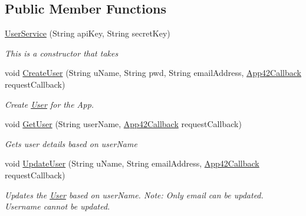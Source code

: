 \subsection*{Public Member Functions}
\begin{DoxyCompactItemize}
\item 
\hyperlink{classcom_1_1shephertz_1_1app42_1_1paas_1_1sdk_1_1windows_1_1user_1_1_user_service_a1f2735751f49689d6c4093a2f52bab68}{User\+Service} (String api\+Key, String secret\+Key)
\begin{DoxyCompactList}\small\item\em This is a constructor that takes \end{DoxyCompactList}\item 
void \hyperlink{classcom_1_1shephertz_1_1app42_1_1paas_1_1sdk_1_1windows_1_1user_1_1_user_service_a737f4de4c3455003279539ba095c3405}{Create\+User} (String u\+Name, String pwd, String email\+Address, \hyperlink{interfacecom_1_1shephertz_1_1app42_1_1paas_1_1sdk_1_1windows_1_1_app42_callback}{App42\+Callback} request\+Callback)
\begin{DoxyCompactList}\small\item\em Create \hyperlink{classcom_1_1shephertz_1_1app42_1_1paas_1_1sdk_1_1windows_1_1user_1_1_user}{User} for the App. \end{DoxyCompactList}\item 
void \hyperlink{classcom_1_1shephertz_1_1app42_1_1paas_1_1sdk_1_1windows_1_1user_1_1_user_service_af658a8c804bcd58fddee8b74d772af1b}{Get\+User} (String user\+Name, \hyperlink{interfacecom_1_1shephertz_1_1app42_1_1paas_1_1sdk_1_1windows_1_1_app42_callback}{App42\+Callback} request\+Callback)
\begin{DoxyCompactList}\small\item\em Gets user details based on user\+Name \end{DoxyCompactList}\item 
void \hyperlink{classcom_1_1shephertz_1_1app42_1_1paas_1_1sdk_1_1windows_1_1user_1_1_user_service_a81ccb064bfe31044707c0bcd465f39fe}{Update\+User} (String u\+Name, String email\+Address, \hyperlink{interfacecom_1_1shephertz_1_1app42_1_1paas_1_1sdk_1_1windows_1_1_app42_callback}{App42\+Callback} request\+Callback)
\begin{DoxyCompactList}\small\item\em Updates the \hyperlink{classcom_1_1shephertz_1_1app42_1_1paas_1_1sdk_1_1windows_1_1user_1_1_user}{User} based on user\+Name. Note\+: Only email can be updated. Username cannot be updated. \end{DoxyCompactList}\item 

\end{DoxyCompactItemize}
